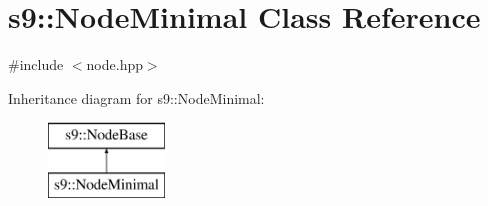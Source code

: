 \hypertarget{classs9_1_1NodeMinimal}{\section{s9\-:\-:Node\-Minimal Class Reference}
\label{classs9_1_1NodeMinimal}
}


{\ttfamily \#include $<$node.\-hpp$>$}

Inheritance diagram for s9\-:\-:Node\-Minimal\-:\begin{figure}[H]
\begin{center}
\leavevmode
\includegraphics[height=2.000000cm]{classs9_1_1NodeMinimal}
\end{center}
\end{figure}
